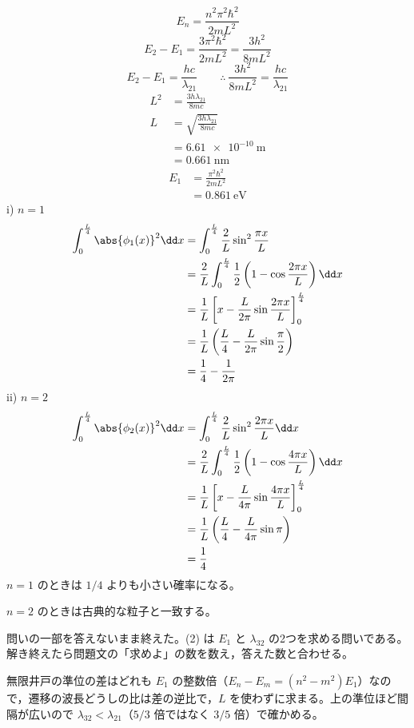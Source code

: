 \[ E_{n}=\frac{n^{2}\pi^{2}\hbar^{2}}{2mL^{2}} \]
\[ E_{2}-E_{1}=\frac{3\pi^{2}\hbar^{2}}{2mL^{2}}=\frac{3h^{2}}{8mL^{2}} \]
\[ E_{2}-E_{1}=\frac{hc}{\lambda_{21}}\qquad\therefore\ \frac{3h^{2}}{8mL^{2}}=\frac{hc}{\lambda_{21}} \]
\begin{align*}
L^{2}&=\frac{3h\lambda_{21}}{8mc}\\
L&=\sqrt{\frac{3h\lambda_{21}}{8mc}}\\
&=\qty{6.61e-10}{\metre}\\
&=\qty{0.661}{\nano\metre}
\end{align*}
\begin{align*}
E_{1}&=\frac{\pi^{2}\hbar^{2}}{2mL^{2}}\\
&=\qty{0.861}{\electronvolt}
\end{align*}
i) $n=1$
\begin{align*}
\int_{0}^{\frac{L}{4}}\abs{\phi_{1}(x)}^{2}\dd x&=\int_{0}^{\frac{L}{4}}\frac{2}{L}\sin^{2}\frac{\pi x}{L}\\
&=\frac{2}{L}\int_{0}^{\frac{L}{4}}\frac{1}{2}\left(1-\cos\frac{2\pi x}{L}\right)\dd x\\
&=\frac{1}{L}\left[x-\frac{L}{2\pi}\sin\frac{2\pi x}{L}\right]_{0}^{\frac{L}{4}}\\
&=\frac{1}{L}\left(\frac{L}{4}-\frac{L}{2\pi}\sin\frac{\pi}{2}\right)\\
&=\frac{1}{4}-\frac{1}{2\pi}
\end{align*}
ii) $n=2$
\begin{align*}
\int_{0}^{\frac{L}{4}}\abs{\phi_{2}(x)}^{2}\dd x&=\int_{0}^{\frac{L}{4}}\frac{2}{L}\sin^{2}\frac{2\pi x}{L}\dd x\\
&=\frac{2}{L}\int_{0}^{\frac{L}{4}}\frac{1}{2}\left(1-\cos\frac{4\pi x}{L}\right)\dd x\\
&=\frac{1}{L}\left[x-\frac{L}{4\pi}\sin\frac{4\pi x}{L}\right]_{0}^{\frac{L}{4}}\\
&=\frac{1}{L}\left(\frac{L}{4}-\frac{L}{4\pi}\sin\pi\right)\\
&=\frac{1}{4}
\end{align*}
$n=1$ のときは $1/4$ よりも小さい確率になる。

$n=2$ のときは古典的な粒子と一致する。
\item {} 問いの一部を答えないまま終えた。(2) は $E_{1}$ と $\lambda_{32}$ の2つを求める問いである。解き終えたら問題文の「求めよ」の数を数え，答えた数と合わせる。
\item 無限井戸の準位の差はどれも $E_{1}$ の整数倍（$E_{n}-E_{m}=(n^{2}-m^{2})E_{1}$）なので，遷移の波長どうしの比は差の逆比で，$L$ を使わずに求まる。上の準位ほど間隔が広いので $\lambda_{32}<\lambda_{21}$（$5/3$ 倍ではなく $3/5$ 倍）で確かめる。
